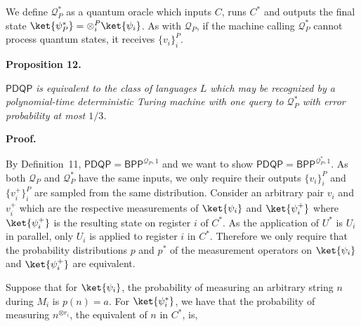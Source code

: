 We define $\mathcal{Q}_{P}^{*}$ as a quantum oracle which inputs $C$, runs $C^{*}$ and outputs the final state $\ket{\psi_{P}^{*}}=\otimes_{i}^{P}\ket{\psi_{i}}$. As with $\mathcal{Q}_{P}$, if the machine calling $\mathcal{Q}_{P}^{*}$ cannot process quantum states, it receives $\{v_{i}\}_{i}^{P}$.\par





\par\medskip\noindent\textbf{
\textbf{Proposition 12}\textbf{.}
}\par



$\mathsf{PDQP}$\emph{ is equivalent to the class of languages $L$ which may be recognized by a polynomial-time deterministic Turing machine with one query to $\mathcal{Q}_{P}^{*}$ with error probability at most $1/3$.}\par






\par\medskip\noindent\textbf{Proof.}\par




By Definition 11, $\mathsf{PDQP}=\mathsf{BPP}^{\mathcal{Q}_{P},1}$ and we want to show $\mathsf{PDQP}=\mathsf{BPP}^{\mathcal{Q}_{P}^{*},1}$. As both $\mathcal{Q}_{P}$ and $\mathcal{Q}_{P}^{*}$ have the same inputs, we only require their outputs $\{v_{i}\}_{i}^{P}$ and $\{v_{i}^{+}\}_{i}^{P}$ are sampled from the same distribution. Consider an arbitrary pair $v_{i}$ and $v_{i}^{+}$ which are the respective measurements of $\ket{\psi_{i}}$ and $\ket{\psi_{i}^{+}}$ where $\ket{\psi_{i}^{+}}$ is the resulting state on register $i$ of $C^{*}$. As the application of $U^{*}$ is $U_{i}$ in parallel, only $U_{i}$ is applied to register $i$ in $C^{*}$. Therefore we only require that the probability distributions $p$ and $p^{*}$ of the measurement operators on $\ket{\psi_{i}}$ and $\ket{\psi_{i}^{+}}$ are equivalent.\par




Suppose that for $\ket{\psi_{i}}$, the probability of measuring an arbitrary string $n$ during $M_{i}$ is $p(n)=a$. For $\ket{\psi_{i}^{*}}$, we have that the probability of measuring $n^{\otimes r_{i}}$, the equivalent of $n$ in $C^{*}$, is,\par


